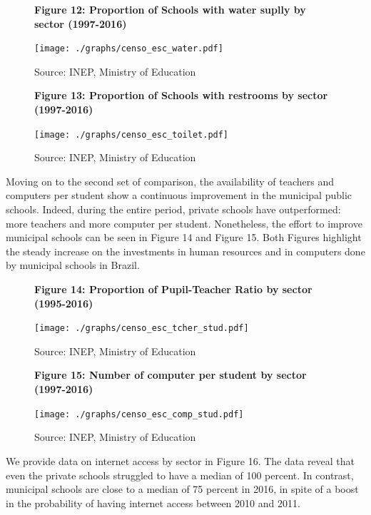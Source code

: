 \documentclass[12pt,]{article}
\begin{document}
\begin{figure}
    \centering
    \textbf{\small Figure 12: Proportion of Schools with water suplly by sector (1997-2016)}\par\medskip
    \texttt{[image: ./graphs/censo\_esc\_water.pdf]}
    \caption*{\footnotesize \hfill Source: INEP, Ministry of Education}
\end{figure}

\begin{figure}
    \centering
    \textbf{\small Figure 13: Proportion of Schools with restrooms by sector (1997-2016)}\par\medskip
    \texttt{[image: ./graphs/censo\_esc\_toilet.pdf]}
    \caption*{\footnotesize \hfill Source: INEP, Ministry of Education}
\end{figure}

Moving on to the second set of comparison, the availability of teachers
and computers per student show a continuous improvement in the municipal
public schools. Indeed, during the entire period, private schools have
outperformed: more teachers and more computer per student. Nonetheless,
the effort to improve municipal schools can be seen in Figure 14 and
Figure 15. Both Figures highlight the steady increase on the investments
in human resources and in computers done by municipal schools in Brazil.

\begin{figure}
    \centering
    \textbf{\small Figure 14: Proportion of Pupil-Teacher Ratio by sector (1995-2016)}\par\medskip
    \texttt{[image: ./graphs/censo\_esc\_tcher\_stud.pdf]}
    \caption*{\footnotesize \hfill Source: INEP, Ministry of Education}
\end{figure}

\begin{figure}
    \centering
    \textbf{\small Figure 15: Number of computer per student by sector (1997-2016)}\par\medskip
    \texttt{[image: ./graphs/censo\_esc\_comp\_stud.pdf]}
    \caption*{\footnotesize \hfill Source: INEP, Ministry of Education}
\end{figure}

We provide data on internet access by sector in Figure 16. The data
reveal that even the private schools struggled to have a median of 100
percent. In contrast, municipal schools are close to a median of 75
percent in 2016, in spite of a boost in the probability of having
internet access between 2010 and 2011.
\end{document}
